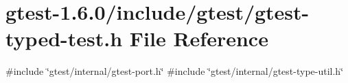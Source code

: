 \hypertarget{gtest-typed-test_8h}{\section{gtest-\/1.6.0/include/gtest/gtest-\/typed-\/test.h \-File \-Reference}
\label{de/dce/gtest-typed-test_8h}
}
{\ttfamily \#include \char`\"{}gtest/internal/gtest-\/port.\-h\char`\"{}}\*
{\ttfamily \#include \char`\"{}gtest/internal/gtest-\/type-\/util.\-h\char`\"{}}\*
